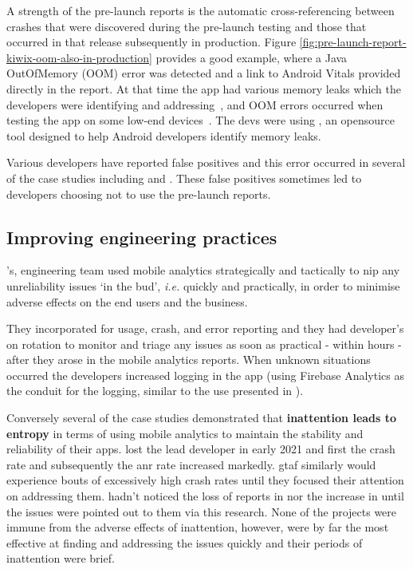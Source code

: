 A strength of the pre-launch reports is the automatic cross-referencing between crashes that were discovered during the pre-launch testing and those that occurred in that release subsequently in production. Figure \ref{fig:pre-launch-report-kiwix-oom-also-in-production} provides a good example, where a Java OutOfMemory (OOM) error was detected and a link to Android Vitals provided directly in the report. At that time the app had various memory leaks which the developers were identifying and addressing~, and OOM errors occurred when testing the app on some low-end devices~. The devs were using , an opensource tool designed to help Android developers identify memory leaks. 

Various developers have reported false positives  and this error occurred in several of the case studies including  and . These false positives sometimes led to developers choosing not to use the pre-launch reports.

\subsection{Improving engineering practices}
's, engineering team used mobile analytics strategically and tactically to nip any unreliability issues `in the bud', \emph{i.e.} quickly and practically, in order to minimise adverse effects on the end users and the business. 

They incorporated  for usage, crash, and  error reporting and they had developer's on rotation to monitor and triage any issues as soon as practical - within hours - after they arose in the mobile analytics reports. When unknown situations occurred the developers increased logging in the app (using Firebase Analytics as the conduit for the logging, similar to the use presented in ).


Conversely several of the case studies demonstrated that \textbf{inattention leads to entropy} in terms of using mobile analytics to maintain the stability and reliability of their apps.  lost the lead developer in early 2021 and first the crash rate and subsequently the \Gls{anr} rate increased markedly. \Gls{gtaf} similarly would experience bouts of excessively high crash rates until they focused their attention on addressing them.  hadn't noticed the loss of reports in  nor the increase in  until the issues were pointed out to them via this research. None of the projects were immune from the adverse effects of inattention, however,  were by far the most effective at finding and addressing the issues quickly and their periods of inattention were brief.

